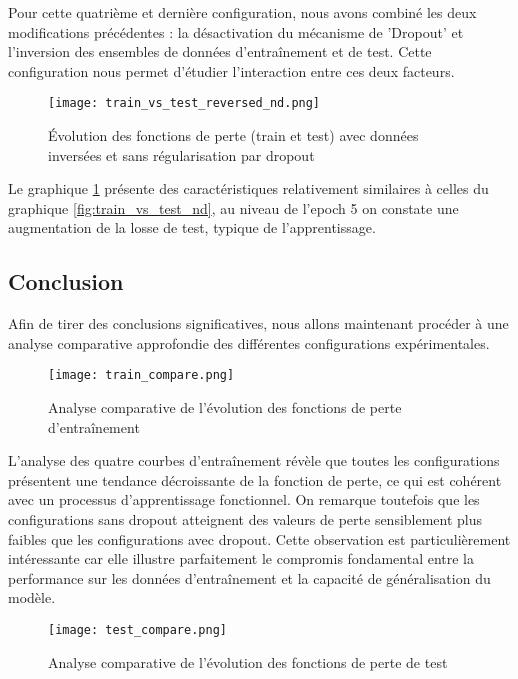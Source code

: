 Pour cette quatrième et dernière configuration, nous avons combiné les deux modifications précédentes : la désactivation du mécanisme de 'Dropout' et l'inversion des ensembles de données d'entraînement et de test. Cette configuration nous permet d'étudier l'interaction entre ces deux facteurs.

\begin{figure}[H]
    \centering
    \texttt{[image: train\_vs\_test\_reversed\_nd.png]}
    \caption{Évolution des fonctions de perte (train et test) avec données inversées et sans régularisation par dropout}
    \label{fig:train_vs_test_reversed_nd}
\end{figure}

Le graphique \ref{fig:train_vs_test_reversed_nd} présente des caractéristiques relativement similaires à celles du graphique \ref{fig:train_vs_test_nd}, au niveau de l'epoch 5 on constate une augmentation de la losse de test, typique de l'apprentissage.

\newpage
\subsection{Conclusion}

Afin de tirer des conclusions significatives, nous allons maintenant procéder à une analyse comparative approfondie des différentes configurations expérimentales.

\begin{figure}[H]
    \centering
    \texttt{[image: train\_compare.png]}
    \caption{Analyse comparative de l'évolution des fonctions de perte d'entraînement}
    \label{fig:train_compare}
\end{figure}

L'analyse des quatre courbes d'entraînement révèle que toutes les configurations présentent une tendance décroissante de la fonction de perte, ce qui est cohérent avec un processus d'apprentissage fonctionnel. On remarque toutefois que les configurations sans dropout atteignent des valeurs de perte sensiblement plus faibles que les configurations avec dropout. Cette observation est particulièrement intéressante car elle illustre parfaitement le compromis fondamental entre la performance sur les données d'entraînement et la capacité de généralisation du modèle.

\begin{figure}[H]
    \centering
    \texttt{[image: test\_compare.png]}
    \caption{Analyse comparative de l'évolution des fonctions de perte de test}
    \label{fig:test_compare}
\end{figure}

